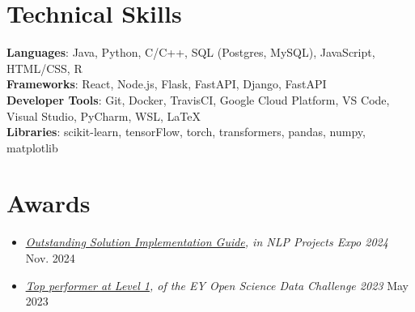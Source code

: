 \documentclass[letterpaper,11pt]{article}
\begin{document}
\section{Technical Skills}
 \begin{itemize}[leftmargin=0.15in, label={}]
    \small{\item{
     \textbf{Languages}{: Java, Python, C/C++, SQL (Postgres, MySQL), JavaScript, HTML/CSS, R} \\
     \textbf{Frameworks}{: React, Node.js, Flask, FastAPI, Django, FastAPI} \\
     \textbf{Developer Tools}{: Git, Docker, TravisCI, Google Cloud Platform, VS Code, Visual Studio, PyCharm, WSL, LaTeX} \\
     \textbf{Libraries}{: scikit-learn, tensorFlow, torch, transformers, pandas, numpy, matplotlib}
    }}
 \end{itemize}

\section*{Awards}
  \begin{itemize}
    \item \textit{\href{https://drive.google.com/file/d/15Zye0DqQrMwGtM-SLBvWo5tUCdOG-SK7/view?usp=sharing}{\underline{Outstanding Solution Implementation Guide}}, in NLP Projects Expo 2024} \hfill {Nov. 2024}
    \item \textit{\href{https://drive.google.com/file/d/1PQot78NAxoTiHbD7beFBZICgjhwmDwTT/view?usp=sharing}{\underline{Top performer at Level 1}}, of the EY Open Science Data Challenge 2023} \hfill {May 2023}
  \end{itemize}

\end{document}
